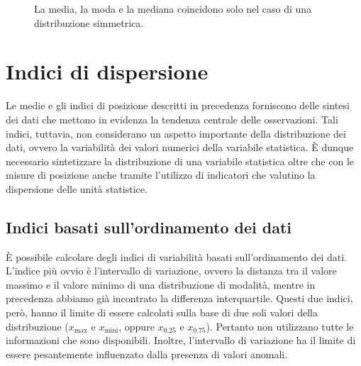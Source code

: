 \begin{figure}
\centering
{}

\caption{La media, la moda e la mediana coincidono solo nel caso di una distribuzione simmetrica.}
\label{fig:distr_simm_media_moda}
\end{figure}


\section{Indici di dispersione}

Le medie e gli indici di posizione descritti in precedenza forniscono delle sintesi dei dati che mettono in evidenza la tendenza centrale delle osservazioni. 
Tali indici, tuttavia, non considerano un aspetto importante della distribuzione dei dati, ovvero la variabilità dei valori numerici della variabile statistica. 
È dunque necessario sintetizzare la distribuzione di una variabile statistica oltre che con le misure di posizione anche tramite l'utilizzo di indicatori che valutino la dispersione delle unità statistice.


\subsection{Indici basati sull'ordinamento dei dati}

È possibile calcolare degli indici di variabilità basati sull'ordinamento dei dati. 
L'indice più ovvio è l'intervallo di variazione, ovvero la distanza tra il valore massimo e il valore minimo di una distribuzione di modalità, mentre in precedenza abbiamo già incontrato la differenza interquartile.
Questi due indici, però, hanno il limite di essere calcolati sulla base di due soli valori della distribuzione ($x_{\text{max}}$ e $x_{\text{mini}}$, oppure $x_{0.25}$ e $x_{0.75}$).
Pertanto non utilizzano tutte le informazioni che sono disponibili.
Inoltre, l'intervallo di variazione ha il limite di essere pesantemente influenzato dalla presenza di valori anomali.


